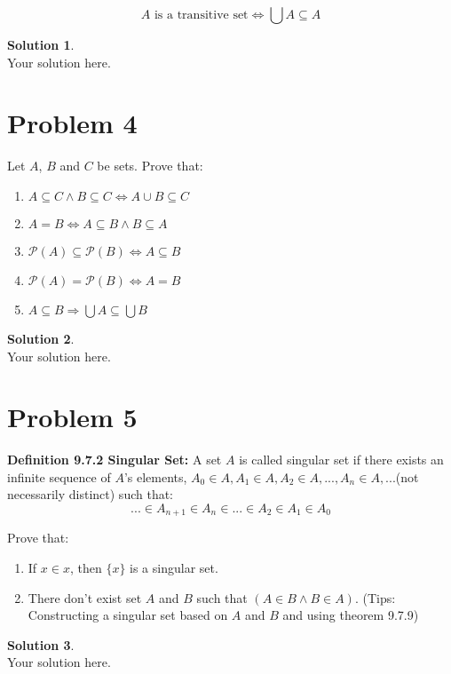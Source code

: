 \documentclass[a4paper,UTF8]{article}
\theoremstyle{definition}
\newtheorem*{solution}{Solution}
\begin{document}
$$A \text{ is a transitive set} \Leftrightarrow \bigcup A \subseteq A$$

\begin{solution}
	~\\
	Your solution here.
\end{solution}



\section*{Problem 4}
Let $A$, $B$ and $C$ be sets. Prove that:
\begin{enumerate}
	\item $A\subseteq C \land B\subseteq C \Leftrightarrow A\cup B \subseteq C$
	\item $A=B \Leftrightarrow A\subseteq B \land B \subseteq A$
	\item $\mathcal{P}(A)\subseteq \mathcal{P}(B) \Leftrightarrow A\subseteq B$
	\item $\mathcal{P}(A) = \mathcal{P}(B) \Leftrightarrow A= B $ 
	\item $A\subseteq B \Rightarrow \bigcup A \subseteq \bigcup B$
	
\end{enumerate}


\begin{solution}
	~\\
	Your solution here.
\end{solution}



\section*{Problem 5}
\textbf{Definition 9.7.2 Singular Set:} A set $A$ is called singular set if there exists an infinite sequence of $A$'s elements, $A_0 \in A,A_1\in A,A_2\in A,...,A_n\in A,...$(not necessarily distinct) such that:
$$...\in A_{n+1}\in A_n \in ... \in A_2 \in A_1 \in A_0$$

Prove that:
\begin{enumerate}
	\item If $x\in x$, then $\{x\}$ is a singular set.
	\item There don't exist set $A$ and $B$ such that $(A\in B \land B\in A)$. (Tips: Constructing a singular set based on $A$ and $B$ and using theorem 9.7.9)
\end{enumerate}


\begin{solution}
	~\\
	Your solution here.
\end{solution}
\end{document}
